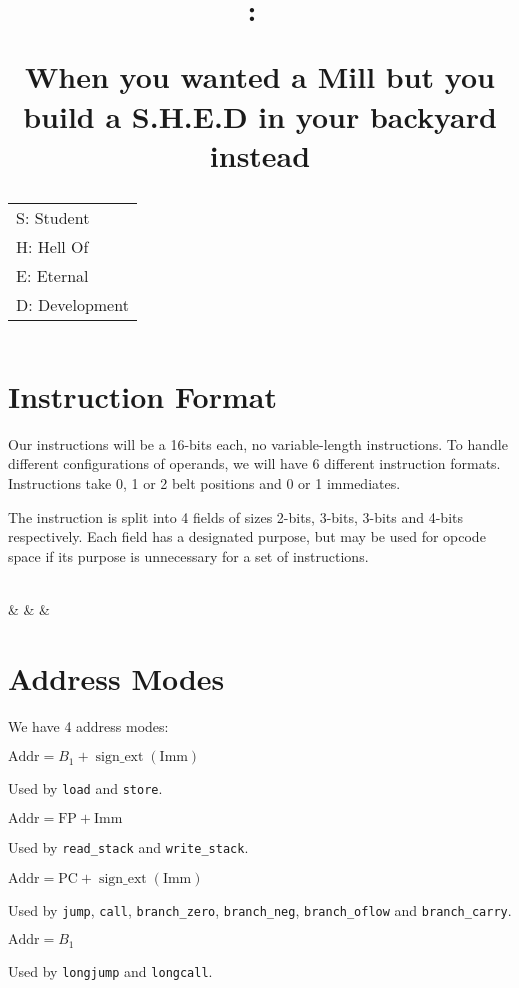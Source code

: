 \documentclass{article}
\title{
	\vspace{2in}
	\textmd{\textbf{\hmwkClass:\ \hmwkTitle}}

	\vspace{0.5in}
	\normalsize{When you wanted a Mill but you build a S.H.E.D in your backyard instead}\\
	\begin{tabular}{l}
		\normalsize{S: Student}\\
		\normalsize{H: Hell Of}\\
		\normalsize{E: Eternal}\\
		\normalsize{D: Development}\\
	\end{tabular}


	\vspace{3in}
}
\author{\hmwkAuthorName}
\date{}
\begin{document}
\maketitle

\pagebreak

\section{Instruction Format}

	Our instructions will be a 16-bits each, no variable-length instructions.
	To handle different configurations of operands, we will have 6 different instruction formats.
	Instructions take 0, 1 or 2 belt positions and 0 or 1 immediates.

	The instruction is split into 4 fields of sizes 2-bits, 3-bits, 3-bits and 4-bits respectively.
	Each field has a designated purpose, but may be used for opcode space if its purpose is unnecessary for a set of instructions.

	\vspace{5mm}

	\begin{bytefield}[endianness=big,bitwidth=3em,bitheight=6ex]{16}
		 \\
		 &
		 &
		 &
		 \\
	\end{bytefield}


\section{Address Modes}

	We have 4 address modes:
	\begin{description}[font=\sffamily\bfseries]
		\item[data] \(\textrm{Addr} = B_1 + \operatorname{sign\_ext}\left(\textrm{Imm}\right)\)

			Used by \texttt{load} and \texttt{store}.

		\item[stack] \(\textrm{Addr} = \textrm{FP} + \textrm{Imm}\)

			Used by \texttt{read\_stack} and \texttt{write\_stack}.

		\item[code] \(\textrm{Addr} = \textrm{PC} + \operatorname{sign\_ext}\left(\textrm{Imm}\right)\)

			Used by \texttt{jump}, \texttt{call}, \texttt{branch\_zero}, \texttt{branch\_neg}, \texttt{branch\_oflow} and \texttt{branch\_carry}.

		\item[long code] \(\textrm{Addr} = B_1\)

			Used by \texttt{longjump} and \texttt{longcall}.

	\end{description}
\end{document}
